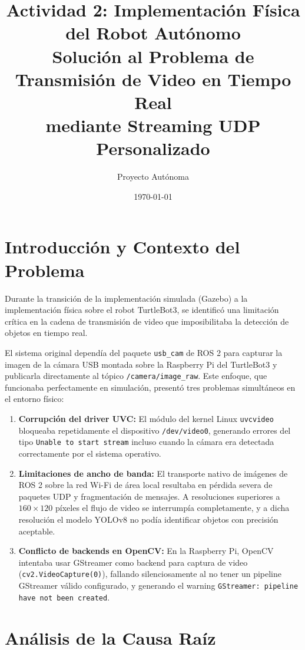 \documentclass[12pt,a4paper]{article}
\title{\textbf{Actividad 2: Implementaci\'on F\'isica del Robot Aut\'onomo}\\
\large Soluci\'on al Problema de Transmisi\'on de Video en Tiempo Real\\mediante Streaming UDP Personalizado}
\author{Proyecto Aut\'onoma}
\date{\today}
\begin{document}
\maketitle

\section{Introducci\'on y Contexto del Problema}

Durante la transici\'on de la implementaci\'on simulada (Gazebo) a la implementaci\'on f\'isica sobre el robot TurtleBot3, se identific\'o una limitaci\'on cr\'itica en la cadena de transmisi\'on de video que imposibilitaba la detecci\'on de objetos en tiempo real.

El sistema original depend\'ia del paquete \texttt{usb\_cam} de ROS 2 para capturar la imagen de la c\'amara USB montada sobre la Raspberry Pi del TurtleBot3 y publicarla directamente al t\'opico \texttt{/camera/image\_raw}. Este enfoque, que funcionaba perfectamente en simulaci\'on, present\'o tres problemas simult\'aneos en el entorno f\'isico:

\begin{enumerate}
    \item \textbf{Corrupci\'on del driver UVC:} El m\'odulo del kernel Linux \texttt{uvcvideo} bloqueaba repetidamente el dispositivo \texttt{/dev/video0}, generando errores del tipo \texttt{Unable to start stream} incluso cuando la c\'amara era detectada correctamente por el sistema operativo.
    \item \textbf{Limitaciones de ancho de banda:} El transporte nativo de im\'agenes de ROS 2 sobre la red Wi-Fi de \'area local resultaba en p\'erdida severa de paquetes UDP y fragmentaci\'on de mensajes. A resoluciones superiores a $160\times120$ p\'ixeles el flujo de video se interrump\'ia completamente, y a dicha resoluci\'on el modelo YOLOv8 no pod\'ia identificar objetos con precisi\'on aceptable.
    \item \textbf{Conflicto de backends en OpenCV:} En la Raspberry Pi, OpenCV intentaba usar GStreamer como backend para captura de video (\texttt{cv2.VideoCapture(0)}), fallando silenciosamente al no tener un pipeline GStreamer v\'alido configurado, y generando el warning \texttt{GStreamer: pipeline have not been created}.
\end{enumerate}

\section{An\'alisis de la Causa Ra\'iz}
\end{document}
